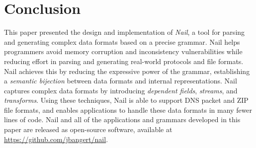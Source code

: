 \section{Conclusion}
\label{s:concl}

This paper presented the design and implementation of \textit{Nail},
a tool for parsing and generating complex data formats based on a
precise grammar.  Nail helps programmers avoid
memory corruption and inconsistency vulnerabilities while reducing effort
in parsing and generating real-world protocols and file formats.
Nail achieves this by reducing the expressive power of the grammar,
establishing a \emph{semantic bijection} between data formats and internal
representations.  Nail captures complex data formats by introducing
\emph{dependent fields}, \emph{streams}, and \emph{transforms}.
Using these techniques, Nail is able to support DNS packet and ZIP file
formats, and enables applications to handle these data formats in many
fewer lines of code.
Nail and all of the applications and grammars developed in this paper
are released as open-source software, available at
\url{https://github.com/jbangert/nail}.


